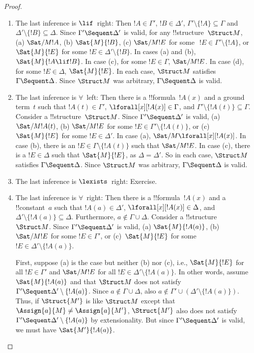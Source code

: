 \documentclass[../../../include/open-logic-section]{subfiles}
\begin{document}
\begin{proof}
\begin{enumerate}
\item The last inference is $\lif$~right: Then $!A \in \Gamma'$, $!B
  \in \Delta'$, $\Gamma' \setminus \{!A\} \subseteq \Gamma$ and
  $\Delta' \setminus \{!B\} \subseteq \Delta$.  Since $\Gamma'
  \Sequent \Delta'$ is valid, for any !!{structure}~$\Struct M$, (a)
  $\Sat/{M}{!A}$, (b) $\Sat{M}{!B}$, (c) $\Sat/{M}{!E}$ for some~$~!E
  \in \Gamma' \setminus \{!A\}$, or $\Sat{M}{!E}$ for some $!E \in
  \Delta' \setminus \{!B\}$.  In cases (a) and (b), $\Sat{M}{!A \lif
    !B}$.  In case (c), for some $!E \in \Gamma$, $\Sat/{M}{!E}$. In
  case (d), for some $!E \in \Delta$, $\Sat{M}{!E}$.  In each case,
  $\Struct M$ satisfies $\Gamma \Sequent \Delta$.  Since $\Struct M$
  was arbitrary, $\Gamma \Sequent \Delta$ is valid.
\item The last inference is $\forall$~left: Then there is a
  !!{formula}~$!A(x)$ and a ground term~$t$ such that $!A(t) \in
  \Gamma'$, $\lforall[x][!A(x)] \in \Gamma$, and $\Gamma' \setminus
  \{!A(t)\} \subseteq \Gamma$.  Consider a !!{structure}~$\Struct
  M$.  Since $\Gamma' \Sequent \Delta'$ is valid, (a)
  $\Sat/{M}{!A(t)}$, (b) $\Sat/{M}{!E}$ for some $!E \in \Gamma'
  \setminus \{!A(t)\}$, or (c)~$\Sat{M}{!E}$ for some $!E \in
  \Delta'$.  In case (a), $\Sat/{M}{\lforall[x][!A(x)]}$. In case (b),
  there is an $!E \in \Gamma \setminus \{!A(t)\}$ such that
  $\Sat/{M}{!E}$.  In case (c), there is a $!E \in \Delta$ such that
  $\Sat{M}{!E}$, as $\Delta = \Delta'$.  So in each case, $\Struct M$
  satisfies $\Gamma \Sequent \Delta$.  Since $\Struct M$ was arbitrary,
  $\Gamma \Sequent \Delta$ is valid.
\item The last inference is $\lexists$~right: Exercise.
\item The last inference is $\forall$~right: Then there is a
  !!{formula}~$!A(x)$ and a !!{constant}~$a$ such that $!A(a) \in
  \Delta'$, $\lforall[x][!A(x)] \in \Delta$, and $\Delta' \setminus
  \{!A(a)\} \subseteq \Delta$.  Furthermore, $a \notin \Gamma \cup
  \Delta$.  Consider a !!{structure}~$\Struct M$.  Since $\Gamma'
  \Sequent \Delta'$ is valid, (a) $\Sat{M}{!A(a)}$, (b) $\Sat/{M}{!E}$
  for some $!E \in \Gamma'$, or (c)~$\Sat{M}{!E}$ for some $!E \in
  \Delta' \setminus \{!A(a)\}$.

  First, suppose (a) is the case but neither (b) nor (c), i.e.,
  $\Sat{M}{!E}$ for all $!E \in \Gamma'$ and $\Sat/{M}{!E}$ for all
  $!E \in \Delta'\setminus \{!A(a)\}$.  In other words, assume
  $\Sat{M}{!A(a)}$ and that $\Struct M$ does not satisfy $\Gamma'
  \Sequent \Delta' \setminus \{!A(a)\}$.  Since $a \notin \Gamma \cup
  \Delta$, also $a \notin \Gamma' \cup (\Delta' \setminus
  \{!A(a)\})$.  Thus, if $\Struct{M'}$ is like $\Struct M$ except that
  $\Assign{a}{M} \neq \Assign{a}{M'}$, $\Struct{M'}$ also does not
  satisfy $\Gamma' \Sequent \Delta' \setminus \{!A(a)\}$ by
  extensionality.  But since $\Gamma' \Sequent \Delta'$ is valid, we
  must have $\Sat{M'}{!A(a)}$.


\end{enumerate}
\end{proof}
\end{document}

